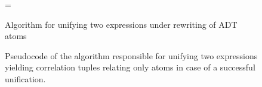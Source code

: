 \begin{figure}[t!]
\begin{algorithm}[H]
\begin{footnotesize}
\DontPrintSemicolon
\everypar={\nl}
\SetAlgoLined
{}
\end{footnotesize}
\caption{Algorithm for unifying two expressions under rewriting of ADT atoms}
\end{algorithm}
\caption{\label{algo:unifyandrewrite}Pseudocode of the algorithm responsible for unifying two expressions
yielding correlation tuples relating only atoms in case of a successful unification.}
\end{figure}